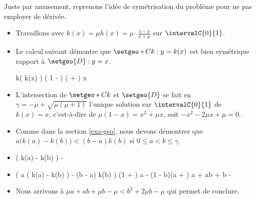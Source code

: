 \begin{remark}
    Juste par amusement, reprenons l'idée de symétrisation du problème pour ne pas employer de dérivée.
    \begin{itemize}
        \item Travaillons avec $k(x) = \mu h(x) = \mu \cdot \frac{1 - x}{x + \mu}$ sur $\intervalC{0}{1}$.


        \item Le calcul suivant démontre que $\setgeo*{C}{k}: y = k(x)$ est bien symétrique rapport à $\setgeo{D}: y = x$.

        \smallskip
        \noindent\kern-8pt\begin{stepcalc}[style=sar]
            k\big( k(x) \big)
        \explnext{}
                 \mu
                  \Big( 1 - \mu \cdot {} \Big)
            \div \Big( \mu \cdot {} + \mu \Big)
        \explnext{}
        \explnext{}
        \explnext{}
            x
        \end{stepcalc}


        \item L'intersection de $\setgeo*{C}{k}$ et $\setgeo{D}$ se fait en $\gamma = - \mu + \sqrt{\mu (\mu + 1)}$ l'unique solution sur $\intervalC{0}{1}$ de
        $k(x) = x$,
        c'est-à-dire de
        $\mu (1 - x) = x^2 + \mu x$,
        soit
        $- x^2 - 2 \mu x + \mu = 0$.


        \item Comme dans la section \ref{exa-geo}, nous devons démontrer que $a \big( k(a) - k(b) \big) < (b - a) k(b)$ si $0 \leq a < b \leq \gamma$.


        \item
        \begin{stepcalc}[style=sar]
             \big( k(a) - k(b) \big)
        \explnext{}
             - 
        \explnext{}
        \end{stepcalc}


        \item
        \begin{stepcalc}[style=ar*]
            \big(
                a \big( k(a) - k(b) \big) - (b - a) k(b)
            \big)
        \explnext{}
            (1 + \mu) a - (1 - b)(a + \mu)
        \explnext{}
            \mu a + ab + \mu b - \mu
        \end{stepcalc}


        \item Nous arrivons à
        $\mu a + ab + \mu b - \mu < b^2 + 2 \mu b - \mu$
        qui permet de conclure.
    \end{itemize}
\end{remark}
